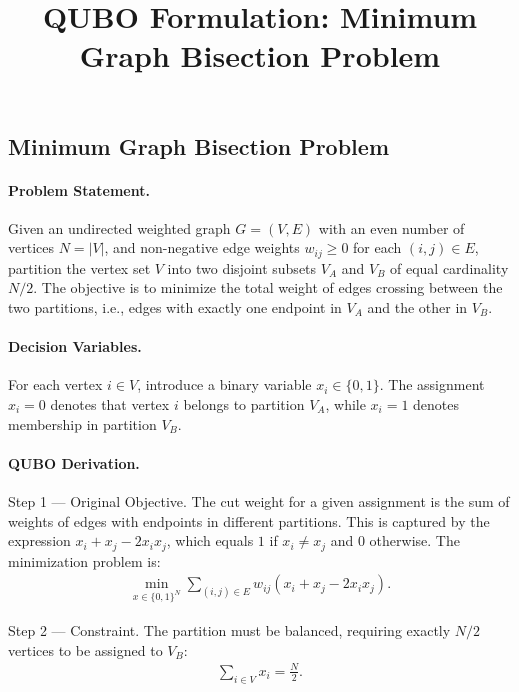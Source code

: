 \documentclass[12pt]{article}
\title{QUBO Formulation: Minimum Graph Bisection Problem}
\date{}
\begin{document}
\maketitle

\subsection*{Minimum Graph Bisection Problem}

\paragraph{Problem Statement.}
Given an undirected weighted graph $G=(V,E)$ with an even number of vertices $N=|V|$, and non-negative edge weights $w_{ij} \ge 0$ for each $(i,j) \in E$, partition the vertex set $V$ into two disjoint subsets $V_A$ and $V_B$ of equal cardinality $N/2$. The objective is to minimize the total weight of edges crossing between the two partitions, i.e., edges with exactly one endpoint in $V_A$ and the other in $V_B$.

\paragraph{Decision Variables.}
For each vertex $i \in V$, introduce a binary variable $x_i \in \{0,1\}$. The assignment $x_i = 0$ denotes that vertex $i$ belongs to partition $V_A$, while $x_i = 1$ denotes membership in partition $V_B$.

\paragraph{QUBO Derivation.}
Step 1 --- Original Objective. The cut weight for a given assignment is the sum of weights of edges with endpoints in different partitions. This is captured by the expression $x_i + x_j - 2x_i x_j$, which equals $1$ if $x_i \neq x_j$ and $0$ otherwise. The minimization problem is:
\begin{align}
\min_{x \in \{0,1\}^N} \sum_{(i,j) \in E} w_{ij} (x_i + x_j - 2x_i x_j).
\end{align}

Step 2 --- Constraint. The partition must be balanced, requiring exactly $N/2$ vertices to be assigned to $V_B$:
\begin{align}
\sum_{i \in V} x_i = \frac{N}{2}.
\end{align}
\end{document}
